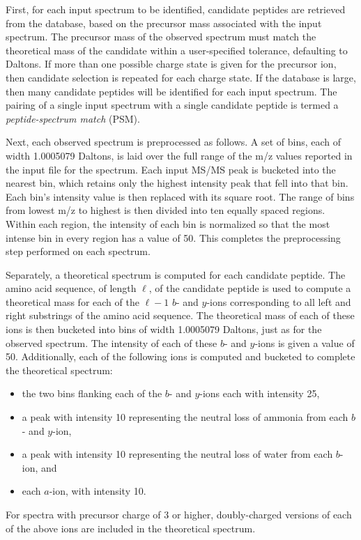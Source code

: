 First, for each input spectrum to be identified, candidate peptides
are retrieved from the database, based on the precursor mass
associated with the input spectrum. The precursor mass of the observed
spectrum must match the theoretical mass of the candidate within a
user-specified tolerance, defaulting to \DIFdelbegin {}\DIFdelend \DIFaddbegin {}\DIFaddend Daltons. If more
than one possible charge state is given for the precursor ion, then
candidate selection is repeated for each charge state. If the database
is large, then many candidate peptides will be identified for each
input spectrum. The pairing of a single input spectrum with a single
candidate peptide is termed a {\it peptide-spectrum match} (PSM).

Next, each observed spectrum is preprocessed as follows. A set of
bins, each of width 1.0005079 Daltons, is laid over the full range of
the m/z values reported in the input file for the spectrum. Each input
MS/MS peak is bucketed into the nearest bin, which retains only the
highest intensity peak that fell into that bin. Each bin's intensity
value is then replaced with its square root. The range of bins from
lowest m/z to highest is then divided into ten equally spaced
regions. Within each region, the intensity of each bin is normalized
so that the most intense bin in every region has a value of 50. This
completes the preprocessing step performed on each spectrum.

Separately, a theoretical spectrum is computed for each candidate
peptide. The amino acid sequence, of
length $\ell$, of the candidate peptide is used to compute a
theoretical mass for each of the $\ell-1$ $b$- and $y$-ions
corresponding to all left and right substrings of the amino acid
sequence.  The theoretical mass of each of these ions is then bucketed
into bins of width 1.0005079 Daltons, just as for the observed
spectrum. The intensity of each of these $b$- and $y$-ions is given a
value of 50. Additionally, each of the following ions is computed and
bucketed to complete the theoretical spectrum:
\begin{itemize}
\item the two bins flanking each of the $b$- and $y$-ions each with
  intensity 25,
\item a peak with intensity 10 representing the neutral loss of
  ammonia from each $b$- and $y$-ion,
\item a peak with intensity 10 representing the neutral loss of water
  from each $b$-ion, and
\item each $a$-ion, with intensity 10.
\end{itemize}
For spectra with precursor charge of 3 or higher, doubly-charged versions of
each of the above ions are included in the theoretical spectrum.

